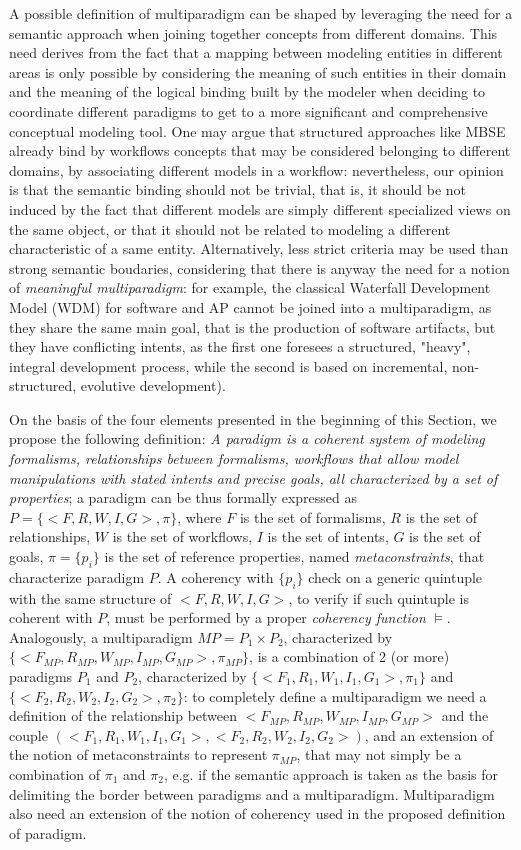 A possible definition of multiparadigm can be shaped by leveraging the need for a semantic approach when joining together concepts from different domains. This need derives from the fact that a mapping between modeling entities in different areas is only possible by considering the meaning of such entities in their domain and the meaning of the logical binding built by the modeler when deciding to coordinate different paradigms to get to a more significant and comprehensive conceptual modeling tool. One may argue that structured approaches like MBSE already bind by workflows concepts that may be considered belonging to different domains, by associating different models in a workflow: nevertheless, our opinion is that the semantic binding should not be trivial, that is, it should be not induced by the fact that different models are simply different specialized views on the same object, or that it should not be related to modeling a different characteristic of a same entity. Alternatively, less strict criteria may be used than strong semantic boudaries, considering that there is anyway the need for a notion of \textit{meaningful multiparadigm}: for example, the classical Waterfall Development Model (WDM) for software and AP cannot be joined into a multiparadigm, as they share the same main goal, that is the production of software artifacts, but they have conflicting intents, as the first one foresees a structured, "heavy", integral development process, while the second is based on incremental, non-structured, evolutive development).

On the basis of the four elements presented in the beginning of this Section, we propose the following definition: \textit{A paradigm is a coherent system of modeling formalisms, relationships between formalisms, workflows that allow model manipulations with stated intents and precise goals, all characterized by a set of properties}; a paradigm can be thus formally expressed as $P=\{<F,R,W,I,G>, \pi \}$, where $F$ is the set of formalisms, $R$ is the set of relationships, $W$ is the set of workflows, $I$ is the set of intents, $G$ is the set of goals, $\pi =\{p_i\}$ is the set of reference properties, named \textit{metaconstraints}, that characterize paradigm $P$. A coherency with $\{p_i\}$ check on a generic quintuple with the same structure of $< F,R,W,I,G>$, to verify if such quintuple is coherent with $P$, must be performed by a proper \textit{coherency function} $\models$. Analogously, a multiparadigm $MP=P_1 \times P_2$, characterized by $\{<F_{MP},R_{MP},W_{MP},I_{MP},G_{MP}>, \pi_{MP}\}$, is a combination of 2 (or more) paradigms $P_1$ and $P_2$, characterized by $\{< F_1,R_1,W_1,I_1,G_1>, \pi_1\}$ and $\{<F_2,R_2,W_2,I_2,G_2>, \pi_2\}$: to completely define a multiparadigm we need a definition of the relationship between $<F_{MP},R_{MP},W_{MP},I_{MP},G_{MP}>$ and the couple $(< F_1,R_1,W_1,I_1,G_1>,<F_2,R_2,W_2,I_2,G_2>)$, and an extension of the notion of metaconstraints to represent $\pi_{MP}$, that may not simply be a combination of $\pi_1$ and $\pi_2$, e.g. if the semantic approach is taken as the basis for delimiting the border between paradigms and a multiparadigm. Multiparadigm also need an extension of the notion of coherency used in the proposed definition of paradigm.

